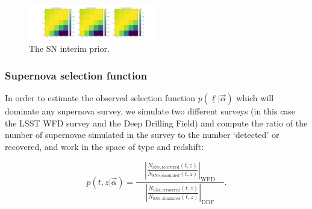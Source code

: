 \documentclass[12pt, twocolumn]{emulateapj}
\newcommand{\textul}{\underline}
\begin{document}
\newpage

\begin{figure}
	\begin{center}
		\includegraphics[width=0.5\textwidth]{fig/lc_interim.png}
		\caption{The SN interim prior.}
		\label{fig:SNintpr}
	\end{center}
\end{figure}

\newpage

\subsubsection{Supernova selection function}
\label{sec:snlcselection}

In order to estimate the observed selection function $p(\textul{\ell} | \vec{\alpha})$ which will dominate any supernova survey, we simulate two different surveys (in this case the LSST WFD survey and the Deep Drilling Field) and compute the ratio of the number of supernovae simulated in the survey to the number `detected' or recovered, and work in the space of type and redshift:

\begin{equation}
    \label{eq:snlcselfunwords}
    p(t, z | \vec{\alpha}) = \frac
    {\quad \left|\frac
    		{N_{\mathrm{SNe,recovered}}(t,z)}
    		{N_{\mathrm{SNe, simulated}}(t,z)}\right|_\mathrm{WFD}\quad}
    {\left|\frac
    	{N_{\mathrm{SNe, recovered}}(t,z)}
    	{N_{\mathrm{SNe, simulated}}(t,z)}\right|_\mathrm{DDF}}.
\end{equation}



\end{document}
